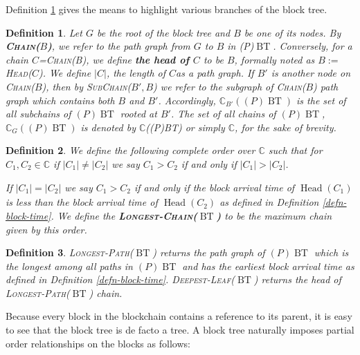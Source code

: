 \documentclass{book}
\newcommand{\assign}{:=}
\newcommand{\tmname}[1]{\textsc{#1}}
\newcommand{\tmop}[1]{\ensuremath{\operatorname{#1}}}
\newcommand{\tmstrong}[1]{\textbf{#1}}
\newcommand{\tmtextbf}[1]{{\bfseries{#1}}}
\newcommand{\tmtextsc}[1]{{\scshape{#1}}}
\newtheorem{definition}{Definition}
\providecommand{\tmname}[1]{\tmtextsc{#1}}
\providecommand{\tmop}[1]{\ensuremath{\mathrm{#1}}}
\providecommand{\tmstrong}[1]{\tmtextbf{#1}}
\providecommand{\tmtextbf}[1]{\tmtextbf{#1}}
\newtheorem{definition}{Definition}
\begin{document}
Definition \ref{defn-chain-subchain} gives the means to highlight various
branches of the block tree.

\begin{definition}
  \label{defn-chain-subchain}Let \label{autolab14}$G$ be the root of the block
  tree and $B$ be one of its nodes. By
  \label{autolab15}{\tmname{{\tmstrong{Chain($B$)}},}} we refer to the path
  graph from $G$ to $B$ in (P)$\tmop{BT}$. Conversely, for a chain
  $C$={\tmname{Chain(B)}}, we define \label{autolab16}{\tmstrong{the head of
  $C$}} to be $B$, formally noted as $B \assign${\tmname{Head($C$)}}. We
  define \label{autolab17}$| C |$, the length of $C$as a path graph. If $B'$
  is another node on {\tmname{Chain($B$)}}, then by
  \label{autolab18}{\tmname{SubChain($B', B$)}} we refer to the subgraph of
  {\tmname{Chain($B$)}} path graph which contains both $B$ and $B'$.
  Accordingly, \label{autolab19}$\mathbb{C}_{B'} ((P) \tmop{BT})$ is the set
  of all subchains of $(P) \tmop{BT}$ rooted at $B'$. The set of all chains of
  $(P) \tmop{BT}$, $\mathbb{C}_G ((P) \tmop{BT})$ is denoted by
  $\mathbb{C}$((P)BT) or simply \label{autolab20}$\mathbb{C}$, for the sake of
  brevity.
\end{definition}

\begin{definition}
  \label{defn-longest-chain}We define the following complete order over
  $\mathbb{C}$ such that for $C_1, C_2 \in \mathbb{C}$ if $| C_1 | \neq | C_2
  |$ we say $C_1 > C_2$ if and only if $| C_1 | > | C_2 |$.
  
  If $| C_1 | = | C_2 |$ we say $C_1 > C_2$ if and only if the block arrival
  time of $\tmop{Head} (C_1)_{}$ is less than the block arrival time of
  $\tmop{Head} (C_2)$ as defined in Definition \ref{defn-block-time}. We
  define the
  \label{autolab21}{\tmstrong{{\tmname{Longest-Chain($\tmop{BT}$)}}}} to be
  the maximum chain given by this order.
\end{definition}

\begin{definition}
  \label{autolab22}{\tmname{Longest-Path($\tmop{BT}$)}} returns the path graph
  of $(P) \tmop{BT}$ which is the longest among all paths in $(P) \tmop{BT}$
  and has the earliest block arrival time as defined in Definition
  \ref{defn-block-time}. \label{autolab23}
  {\tmname{Deepest-Leaf($\tmop{BT}$)}} returns the head of
  {\tmname{Longest-Path($\tmop{BT}$)}} chain.
\end{definition}

Because every block in the blockchain contains a reference to its parent, it
is easy to see that the block tree is de facto a tree. A block tree naturally
imposes partial order relationships on the blocks as follows:
\end{document}
